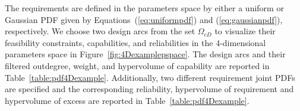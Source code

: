 The requirements are defined in the parameters space by either a uniform or Gaussian \ac{PDF} given by Equations~(\ref{eq:uniformpdf}) and (\ref{eq:gaussianpdf}), respectively. We choose two design arcs from the set $\Omega_{cD}$ to visualize their feasibility constraints, capabilities, and reliabilities in the 4-dimensional parameters space in Figure~\ref{fig:4Dexamplepspace}. The design arcs and their filtered outdegree, weight, and hypervolume of capability are reported in Table~\ref{table:pdf4Dexample}. Additionally, two different requirement joint \acp{PDF} are specified and the corresponding reliability, hypervolume of requirement and hypervolume of excess are reported in Table~\ref{table:pdf4Dexample}.

\newcommand{\cwaa}{0.75cm} %
\newcommand{\cwa}{1.5cm} %
\newcommand{\cwc}{1.5cm} %
\newcommand{\cwd}{1cm} %
\newcommand{\cwe}{1.5cm} %
\newcommand{\cwf}{1.5cm} %
%
%
\newcommand{\cwb}{1.1cm} %
\newcommand{\cwi}{1.1cm} %
\newcommand{\cwj}{1.1cm} %

